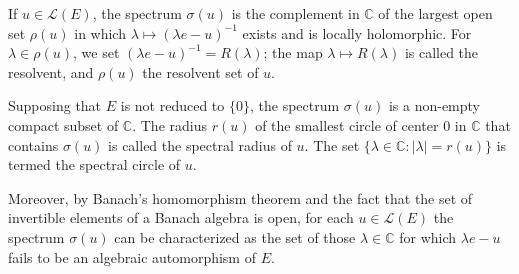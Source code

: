 If $u \in \mathcal{L}(E)$, the spectrum $\sigma(u)$ is the complement in $\mathbb{C}$ of the largest open set $\rho(u)$ in which $\lambda \mapsto (\lambda e - u)^{-1}$ exists and is locally holomorphic. For $\lambda \in \rho(u)$, we set $(\lambda e - u)^{-1} = R(\lambda)$; the map $\lambda \mapsto R(\lambda)$ is called the resolvent, and $\rho(u)$ the resolvent set of $u$.

Supposing that $E$ is not reduced to $\{0\}$, the spectrum $\sigma(u)$ is a non-empty compact subset of $\mathbb{C}$. The radius $r(u)$ of the smallest circle of center $0$ in $\mathbb{C}$ that contains $\sigma(u)$ is called the spectral radius of $u$. The set $\{\lambda \in \mathbb{C} : |\lambda| = r(u)\}$ is termed the spectral circle of $u$.

Moreover, by Banach's homomorphism theorem and the fact that the set of invertible elements of a Banach algebra is open, for each $u \in \mathcal{L}(E)$ the spectrum $\sigma(u)$ can be characterized as the set of those $\lambda \in \mathbb{C}$ for which $\lambda e - u$ fails to be an algebraic automorphism of $E$.
